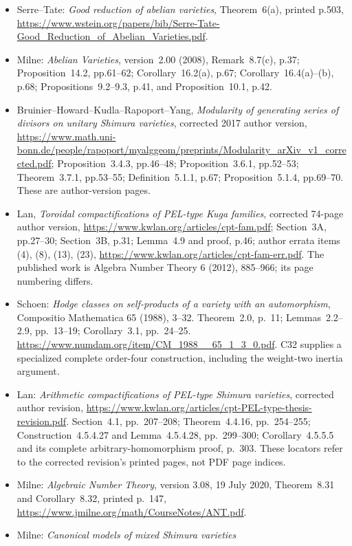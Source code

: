\begin{itemize}[leftmargin=*]
\item Serre--Tate: \emph{Good reduction of abelian varieties},
Theorem~6(a), printed p.503,
\url{https://www.wstein.org/papers/bib/Serre-Tate-Good_Reduction_of_Abelian_Varieties.pdf}.
\item Milne: \emph{Abelian Varieties}, version~2.00 (2008),
Remark~8.7(c), p.37; Proposition~14.2, pp.61--62;
Corollary~16.2(a), p.67; Corollary~16.4(a)--(b), p.68;
Propositions~9.2--9.3, p.41, and Proposition~10.1, p.42.
\item Bruinier--Howard--Kudla--Rapoport--Yang,
\emph{Modularity of generating series of divisors on unitary
Shimura varieties}, corrected 2017 author version,
\url{https://www.math.uni-bonn.de/people/rapoport/myalggeom/preprints/Modularity_arXiv_v1_corrected.pdf};
Proposition~3.4.3, pp.46--48; Proposition~3.6.1, pp.52--53;
Theorem~3.7.1, pp.53--55; Definition~5.1.1, p.67;
Proposition~5.1.4, pp.69--70. These are author-version pages.
\item Lan, \emph{Toroidal compactifications of PEL-type Kuga
families}, corrected 74-page author version,
\url{https://www.kwlan.org/articles/cpt-fam.pdf};
Section~3A, pp.27--30; Section~3B, p.31;
Lemma~4.9 and proof, p.46; author errata items (4), (8),
(13), (23), \url{https://www.kwlan.org/articles/cpt-fam-err.pdf}.
The published work is Algebra Number Theory 6 (2012),
885--966; its page numbering differs.
\item Schoen: \emph{Hodge classes on self-products of a variety
with an automorphism}, Compositio Mathematica 65 (1988),
3--32. Theorem~2.0, p.~11; Lemmas~2.2--2.9,
pp.~13--19; Corollary~3.1, pp.~24--25.
\url{https://www.numdam.org/item/CM_1988__65_1_3_0.pdf}.
C32 supplies a specialized complete order-four construction,
including the weight-two inertia argument.
\item Lan: \emph{Arithmetic compactifications of PEL-type
Shimura varieties}, corrected author revision,
\url{https://www.kwlan.org/articles/cpt-PEL-type-thesis-revision.pdf}.
Section~4.1, pp.~207--208; Theorem~4.4.16,
pp.~254--255; Construction~4.5.4.27 and
Lemma~4.5.4.28, pp.~299--300; Corollary~4.5.5.5
and its complete arbitrary-homomorphism proof, p.~303.
These locators refer to the corrected revision's printed
pages, not PDF page indices.
\item Milne: \emph{Algebraic Number Theory}, version 3.08,
19 July 2020, Theorem~8.31 and Corollary~8.32,
printed p.~147, \url{https://www.jmilne.org/math/CourseNotes/ANT.pdf}.
\item Milne: \emph{Canonical models of mixed Shimura varieties
}
\end{itemize}
